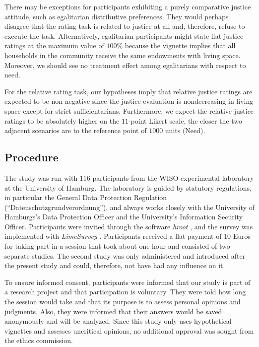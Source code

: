 \documentclass[12pt]{scrartcl}
\begin{document}
There may be exceptions for participants exhibiting a purely comparative justice attitude, such as egalitarian distributive preferences.
They would perhaps disagree that the rating task is related to justice at all and, therefore, refuse to execute the task.
Alternatively, egalitarian participants might state flat justice ratings at the maximum value of $100\%$ because the vignette implies that all households in the community receive the same endowments with living space.
Moreover, we should see no treatment effect among egalitarians with respect to need.

For the relative rating task, our hypotheses imply that relative justice ratings are expected to be non-negative since the justice evaluation is nondecreasing in living space except for strict sufficientarians.
Furthermore, we expect the relative justice ratings to be absolutely higher on the $11$-point Likert scale, the closer the two adjacent scenarios are to the reference point of $1000$ units (Need).


\subsection{Procedure}\label{sec:procedure}
The study was run with $116$ participants from the WISO experimental laboratory at the University of Hamburg.
The laboratory is guided by statutory regulations, in particular the General Data Protection Regulation (``Datenschutzgrundverordnung''), and always works closely with the University of Hamburgs's Data Protection Officer and the University's Information Security Officer.
Participants were invited through the software \textit{hroot} \citep{bock_hroot_2014}, and the survey was implemented with \textit{LimeSurvey} \citep{limesurvey_project_team_limesurvey_2020}.
Participants received a flat payment of $10$ Euros for taking part in a session that took about one hour and consisted of two separate studies.
The second study was only administered and introduced after the present study and could, therefore, not have had any influence on it.

To ensure informed consent, participants were informed that our study is part of a research project and that participation is voluntary.
They were told how long the session would take and that its purpose is to assess personal opinions and judgments.
Also, they were informed that their answers would be saved anonymously and will be analyzed.
Since this study only uses hypothetical vignettes and assesses uncritical opinions, no additional approval was sought from the ethics commission.
\end{document}
